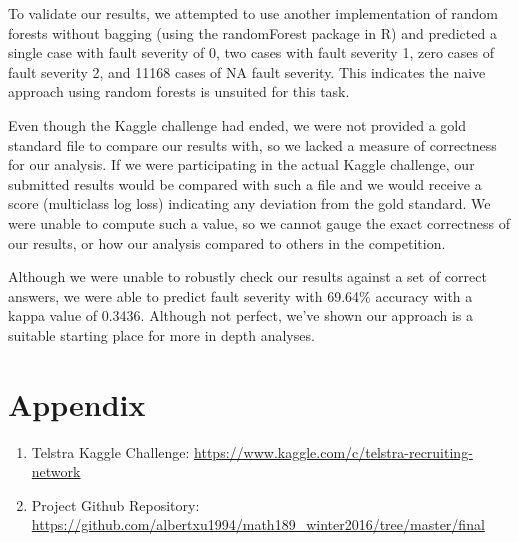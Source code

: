 \documentclass[11pt]{article} %
\begin{document}
To validate our results, we attempted to use another implementation of random forests without bagging (using the randomForest package in R) and predicted a single case with fault severity of 0, two cases with fault severity 1, zero cases of fault severity 2, and 11168 cases of NA fault severity. This indicates the naive approach using random forests is unsuited for this task.

Even though the Kaggle challenge had ended, we were not provided a gold standard file to compare our results with, so we lacked a measure of correctness for our analysis. If we were participating in the actual Kaggle challenge, our submitted results would be compared with such a file and we would receive a score (multiclass log loss) indicating any deviation from the gold standard. We were unable to compute such a value, so we cannot gauge the exact correctness of our results, or how our analysis compared to others in the competition.

Although we were unable to robustly check our results against a set of correct answers, we were able to predict fault severity with 69.64\% accuracy with a kappa value of 0.3436. Although not perfect, we’ve shown our approach is a suitable starting place for more in depth analyses.

\section*{Appendix}
\begin{enumerate}
\item Telstra Kaggle Challenge: \url{https://www.kaggle.com/c/telstra-recruiting-network}
\item Project Github Repository: \url{https://github.com/albertxu1994/math189_winter2016/tree/master/final}
\end{enumerate}
\end{document}

